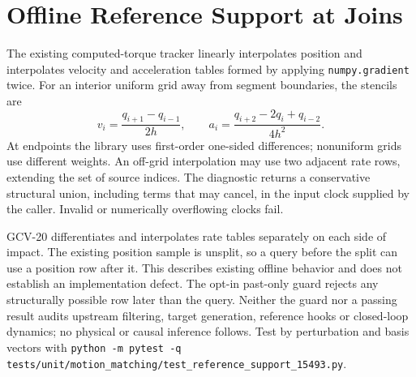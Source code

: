 \documentclass{article}
\begin{document}
\section{Offline Reference Support at Joins}
The existing computed-torque tracker linearly interpolates position and
interpolates velocity and acceleration tables formed by applying
\texttt{numpy.gradient} twice. For an interior uniform grid away from
segment boundaries, the stencils are
\[
v_i=\frac{q_{i+1}-q_{i-1}}{2h},\qquad
a_i=\frac{q_{i+2}-2q_i+q_{i-2}}{4h^2}.
\]
At endpoints the library uses first-order one-sided differences; nonuniform
grids use different weights. An off-grid interpolation may use two adjacent
rate rows, extending the set of source indices. The diagnostic returns a
conservative structural union, including terms that may cancel, in the input
clock supplied by the caller. Invalid or numerically overflowing clocks fail.

GCV-20 differentiates and interpolates rate tables separately on each side
of impact. The existing position sample is unsplit, so a query
before the split can use a position row after it. This describes existing
offline behavior and does not establish an implementation defect. The opt-in
past-only guard rejects any structurally possible row later than the query.
Neither the guard nor a passing result audits upstream filtering, target
generation, reference hooks or closed-loop dynamics; no physical or causal
inference follows. Test by perturbation and basis vectors with
\texttt{python -m pytest -q
tests/unit/motion\_matching/test\_reference\_support\_15493.py}.
\end{document}
